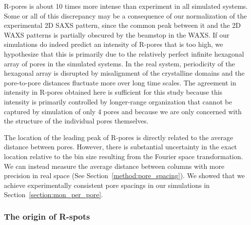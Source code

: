 \documentclass[journal=jpcbfk,manuscript=article]{achemso}
\begin{document}
  R-pores is about 10 times more intense than experiment in all simulated
  systems. Some or all of this discrepancy may be a consequence of our
  normalization of the experimental 2D SAXS pattern, since the common peak
  between it and the 2D WAXS patterns is partially obscured by the beamstop in
  the WAXS. If our simulations do indeed predict an intensity of R-pores that is
  too high, we hypothesize that this is primarily due to the relatively perfect
  infinite hexagonal array of pores in the simulated systems. In the real system,
  periodicity of the hexagonal array is disrupted by misalignment of the
  crystalline domains and the pore-to-pore distances fluctuate more over long
  time scales. 
  The agreement in intensity in R-pores obtained here is sufficient for this
  study because this intensity is primarily controlled by longer-range
  organization that cannot be captured by simulation of only 4 pores and because
  we are only concerned with the structure of the individual pores themselves. 
  
  The location of the leading peak of R-pores is directly related to the
  average distance between pores. However, there is substantial uncertainty in
  the exact location relative to the bin size resulting from the Fourier space
  transformation. We can instead measure the average distance between columns
  with more precision in real space (See Section~\ref{method:pore_spacing}). We
  showed that we achieve experimentally consistent pore spacings in our
  simulations in Section~\ref{section:mon_per_pore}. 

  \subsubsection{The origin of R-spots}\label{section:rspots}
  
\end{document}
